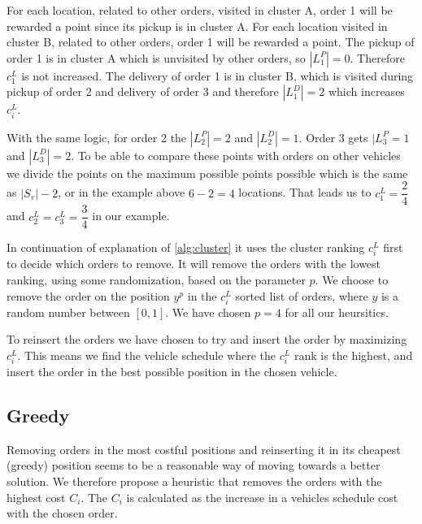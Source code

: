 \documentclass[../main.tex]{subfiles}
\begin{document}
For each location, related to other orders, visited in cluster A, order 1 will be rewarded a point since its pickup is in cluster A. 
For each location visited in cluster B, related to other orders, order 1 will be rewarded a point.
The pickup of order 1 is in cluster A which is unvisited by other orders, so $|L^P_{1}| = 0$.
Therefore  $c^L_1$ is not increased.
The delivery of order 1 is in cluster B, which is visited during pickup of order 2 and delivery of order 3 and therefore $|L^D_{1}|=2$ which increases $c^L_i$. \par
With the same logic, for order 2 the $|L^P_{2}|=2$ and $|L^D_{2}| = 1$.
Order 3 gets $|L^P_{3}=1$ and $|L^D_3| = 2$.
To be able to compare these points with orders on other vehicles we divide the points on the maximum possible points possible which is the same as $|S_v|-2$, or in the example above $6-2 = 4$ locations. 
That leads us to $c^L_1 = \dfrac{2}{4}$ and $c^L_2 = c^L_3 = \dfrac{3}{4}$ in our example. \par

In continuation of explanation of \cref{alg:cluster} it uses the cluster ranking $c^L_i$ first to decide which orders to remove.
It will remove the orders with the lowest ranking, using some randomization, based on the parameter $p$. 
We choose to remove the order on the position $y^p$ in the $c^L_i$ sorted list of orders, where $y$ is a random number between $[0,1]$. We have chosen $p=4$ for all our heursitics.  \newline \par
To reinsert the orders we have chosen to try and insert the order by maximizing $c^L_i$. This means we find the vehicle schedule where the $c^L_i$ rank is the highest, and insert the order in the best possible position in the chosen vehicle. 

\subsection{Greedy}
\label{sec:greedy}
Removing orders in the most costful positions and reinserting it in its cheapest (greedy) position seems to be a reasonable way of moving towards a better solution.
We therefore propose a heuristic that removes the orders with the highest cost $C_{i}$.
The $C_i$ is calculated as the increase in a vehicles schedule cost with the chosen order.
\end{document}
